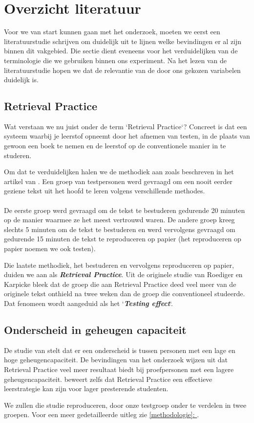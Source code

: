 \documentclass{hogent-article}
\newcommand{\boldit}[1]{\emph{\textbf{#1}}}
\newcommand{\customref}[1]{\underline{\ref{#1}: \nameref{#1}}}
\begin{document}
\section{Overzicht literatuur}

Voor we van start kunnen gaan met het onderzoek, moeten we eerst een literatuurstudie schrijven om duidelijk uit te lijnen welke bevindingen er al zijn binnen dit vakgebied. Die sectie dient eveneens voor het verduidelijken van de terminologie die we gebruiken binnen ons experiment. Na het lezen van de literatuurstudie hopen we dat de relevantie van de door ons gekozen variabelen duidelijk is.

\subsection{Retrieval Practice}
\label{RetrievalPractice}
Wat verstaan we nu juist onder de term `Retrieval Practice`? Concreet is dat een systeem waarbij je leerstof opneemt door het afnemen van testen, in de plaats van gewoon een boek te nemen en de leerstof op de conventionele manier in te studeren.\\
\par
\noindent
Om dat te verduidelijken halen we de methodiek aan zoals beschreven in het artikel van \textcite{Roediger_2006}. Een groep van testpersonen werd gevraagd om een nooit eerder geziene tekst uit het hoofd te leren volgens verschillende methodes.\\\\De eerste groep werd gevraagd om de tekst te bestuderen gedurende 20 minuten op de manier waarmee ze het meest vertrouwd waren. De andere groep kreeg slechts 5 minuten om de tekst te bestuderen en werd vervolgens gevraagd om gedurende 15 minuten de tekst te reproduceren op papier (het reproduceren op papier noemen we ook testen).\\

\par
\noindent
Die laatste methodiek, het bestuderen en vervolgens reproduceren op papier, duiden we aan als \boldit{Retrieval Practice}. Uit de originele studie van Roediger en Karpicke bleek dat de groep die aan Retrieval Practice deed veel meer van de originele tekst onthield na twee weken dan de groep die conventioneel studeerde. Dat fenomeen wordt aangeduid als het `\boldit{Testing effect}`.

\subsection{Onderscheid in geheugen capaciteit}
\label{geheugencapaciteit}
De studie van \textcite{Agarwal_2016} stelt dat er een onderscheid is tussen personen met een lage en hoge geheugencapaciteit. De bevindingen van het onderzoek wijzen uit dat Retrieval Practice veel meer resultaat biedt bij proefpersonen met een lagere geheugencapaciteit. \textcite{Agarwal_2016} beweert zelfs dat Retrieval Practice een effectieve leerstrategie kan zijn voor lager presterende studenten.\\
\par
\noindent
We zullen die studie reproduceren, door onze testgroep onder te verdelen in twee groepen. Voor een meer gedetailleerde uitleg zie \customref{methodologie}.
\end{document}
